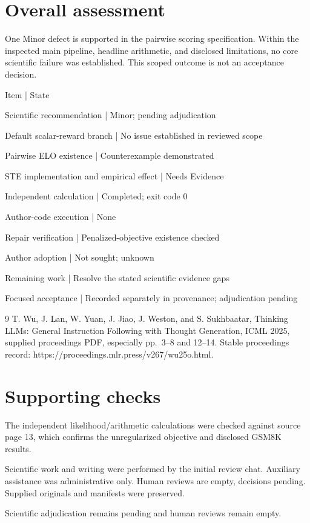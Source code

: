 \documentclass[10pt]{article}
\begin{document}
\section*{Overall assessment}
One Minor defect is supported in the pairwise scoring specification. Within the inspected main pipeline, headline arithmetic, and disclosed limitations, no core scientific failure was established. This scoped outcome is not an acceptance decision.\par
Item | State\par
Scientific recommendation | Minor; pending adjudication\par
Default scalar-reward branch | No issue established in reviewed scope\par
Pairwise ELO existence | Counterexample demonstrated\par
STE implementation and empirical effect | Needs Evidence\par
Independent calculation | Completed; exit code 0\par
Author-code execution | None\par
Repair verification | Penalized-objective existence checked\par
Author adoption | Not sought; unknown\par
Remaining work | Resolve the stated scientific evidence gaps\par
Focused acceptance | Recorded separately in provenance; adjudication pending\par
9 T. Wu, J. Lan, W. Yuan, J. Jiao, J. Weston, and S. Sukhbaatar, Thinking LLMs: General Instruction Following with Thought Generation, ICML 2025, supplied proceedings PDF, especially pp. 3–8 and 12–14. Stable proceedings record: https://proceedings.mlr.press/v267/wu25o.html.\par
\section*{Supporting checks}
The independent likelihood/arithmetic calculations were checked against source page 13, which confirms the unregularized objective and disclosed GSM8K results.\par
Scientific work and writing were performed by the initial review chat. Auxiliary assistance was administrative only. Human reviews are empty, decisions pending. Supplied originals and manifests were preserved.\par
Scientific adjudication remains pending and human reviews remain empty.\par
\end{document}
